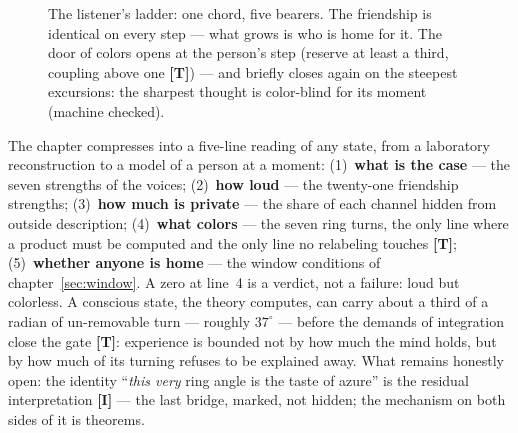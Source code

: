 \documentclass[11pt,letterpaper]{article}
\newcommand{\stT}{\textbf{[T]}\xspace}
\newcommand{\stI}{\textbf{[I]}\xspace}
\begin{document}
\begin{figure}[H]
\centering
{}
\caption{The listener's ladder: one chord, five bearers. The
friendship is identical on every step --- what grows is who is home
for it. The door of colors opens at the person's step (reserve at
least a third, coupling above one \stT) --- and briefly closes
again on the steepest excursions: the sharpest thought is
color-blind for its moment (machine checked).}
\label{fig:ladder}
\end{figure}

\begin{factbox}
The chapter compresses into a five-line reading of any state, from a
laboratory reconstruction to a model of a person at a moment:
(1)~\textbf{what is the case} --- the seven strengths of the voices;
(2)~\textbf{how loud} --- the twenty-one friendship strengths;
(3)~\textbf{how much is private} --- the share of each channel hidden
from outside description; (4)~\textbf{what colors} --- the seven ring
turns, the only line where a product must be computed and the only
line no relabeling touches \stT; (5)~\textbf{whether anyone is home}
--- the window conditions of chapter~\ref{sec:window}. A zero at
line~4 is a verdict, not a failure: loud but colorless. A conscious
state, the theory computes, can carry about a third of a radian of
un-removable turn --- roughly $37^\circ$ --- before the demands of
integration close the gate \stT: experience is bounded not by how
much the mind holds, but by how much of its turning refuses to be
explained away. What remains honestly open: the identity ``\emph{this
very} ring angle is the taste of azure'' is the residual
interpretation \stI{} --- the last bridge, marked, not hidden; the
mechanism on both sides of it is theorems.
\end{factbox}
\end{document}
